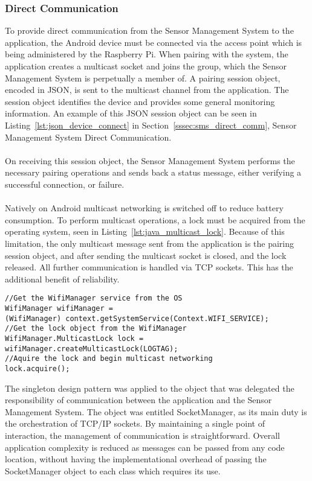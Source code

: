 \documentclass{article}
\begin{document}
\subsubsection{Direct Communication}	
To provide direct communication from the Sensor Management System to the application, the Android device must be connected via the access point which is being administered by the Raspberry Pi. When pairing with the system, the application creates a multicast socket and joins the group, which the Sensor Management System is perpetually a member of. A pairing session object, encoded in JSON, is sent to the multicast channel from the application. The session object identifies the device and provides some general monitoring information. An example of this JSON session object can be seen in Listing~\ref{lst:json_device_connect} in Section~\ref{sssec:sms_direct_comm}, Sensor Management System Direct Communication. \\\\
On receiving this session object, the Sensor Management System performs the necessary pairing operations and sends back a status message, either verifying a successful connection, or failure. \\\\
Natively on Android multicast networking is switched off to reduce battery consumption. To perform multicast operations, a lock must be acquired from the operating system, seen in Listing~\ref{lst:java_multicast_lock}. Because of this limitation, the only multicast message sent from the application is the pairing session object, and after sending the multicast socket is closed, and the lock released. All further communication is handled via TCP sockets. This has the additional benefit of reliability.
\begin{lstlisting}[caption={Multicast lock acquisition},label={lst:java_multicast_lock}]
//Get the WifiManager service from the OS
WifiManager wifiManager = 
(WifiManager) context.getSystemService(Context.WIFI_SERVICE);
//Get the lock object from the WifiManager
WifiManager.MulticastLock lock = wifiManager.createMulticastLock(LOGTAG);
//Aquire the lock and begin multicast networking
lock.acquire();
\end{lstlisting}	
The singleton design pattern was applied to the object that was delegated the responsibility of communication between the application and the Sensor Management System. The object was entitled SocketManager, as its main duty is the orchestration of TCP/IP sockets. By maintaining a single point of interaction, the management of communication is straightforward. Overall application complexity is reduced as messages can be passed from any code location, without having the implementational overhead of passing the SocketManager object to each class which requires its use. \\\\
\end{document}
